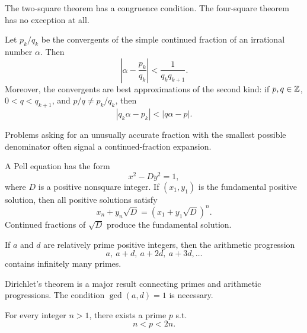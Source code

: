     \begin{remark}
        The two-square theorem has a congruence condition. The four-square
        theorem has no exception at all.
    \end{remark}

    \begin{theorem}
        Let $p_k/q_k$ be the convergents of the simple continued fraction of an
        irrational number $\alpha$. Then
        \[
            \left|\alpha-\frac{p_k}{q_k}\right|
            <
            \frac{1}{q_kq_{k+1}}.
        \]
        Moreover, the convergents are best approximations of the second kind:
        if $p,q\in\mathbb{Z}$, $0<q<q_{k+1}$, and $p/q\neq p_k/q_k$, then
        \[
            |q_k\alpha-p_k|<|q\alpha-p|.
        \]
    \end{theorem}

    \begin{strategy}
        Problems asking for an unusually accurate fraction with the smallest
        possible denominator often signal a continued-fraction expansion.
    \end{strategy}

    \begin{definition}
        A Pell equation has the form
        \[
            x^2-Dy^2=1,
        \]
        where $D$ is a positive nonsquare integer. If $(x_1,y_1)$ is the
        fundamental positive solution, then all positive solutions satisfy
        \[
            x_n+y_n\sqrt{D}
            =
            (x_1+y_1\sqrt{D})^n.
        \]
        Continued fractions of $\sqrt{D}$ produce the fundamental solution.
    \end{definition}

    \begin{theorem}
        If $a$ and $d$ are relatively prime positive integers, then the
        arithmetic progression
        \[
            a,\ a+d,\ a+2d,\ a+3d,\dots
        \]
        contains infinitely many primes.
    \end{theorem}

    \begin{remark}
        Dirichlet's theorem is a major result connecting primes and arithmetic
        progressions. The condition $\gcd(a,d)=1$ is necessary.
    \end{remark}

    \begin{theorem}
        For every integer $n>1$, there exists a prime $p$ s.t.
        \[
            n<p<2n.
        \]
    \end{theorem}

